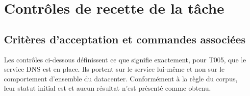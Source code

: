 \chapter{Contrôles de recette de la tâche}
\label{ch:recette}

\section{Critères d'acceptation et commandes associées}

Les contrôles ci-dessous définissent ce que signifie exactement, pour T005, que
le service DNS est en place. Ils portent sur le service lui-même et non sur le
comportement d'ensemble du datacenter. Conformément à la règle du corpus, leur
statut initial est  et aucun résultat n'est présenté comme
obtenu.

